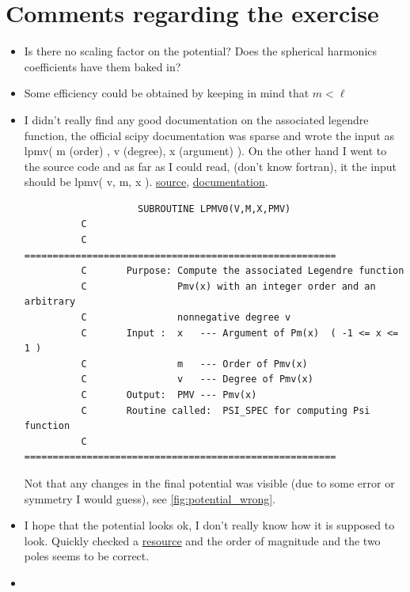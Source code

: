 \documentclass[x11names]{article}
\begin{document}
\section{Comments regarding the exercise}
  \begin{itemize}
    \item Is there no scaling factor on the potential? Does the spherical harmonics coefficients have them baked in?
    \item Some efficiency could be obtained by keeping in mind that \(m<\ell\)
    \item I didn't really find any good documentation on the associated legendre function, the official scipy documentation was sparse and wrote the input as lpmv( m (order) , v (degree), x (argument)  ).
          On the other hand I went to the source code and as far as I could read, (don't know fortran), it the input should be lpmv( v, m, x ). \href{https://github.com/scipy/scipy/blob/master/scipy/special/specfun/specfun.f#L7965}{source}, \href{http://docs.scipy.org/doc/scipy/reference/generated/scipy.special.lpmv.html#scipy.special.lpmv} {documentation}.
          \begin{lstlisting}
                    SUBROUTINE LPMV0(V,M,X,PMV)
          C
          C       =======================================================
          C       Purpose: Compute the associated Legendre function
          C                Pmv(x) with an integer order and an arbitrary
          C                nonnegative degree v
          C       Input :  x   --- Argument of Pm(x)  ( -1 <= x <= 1 )
          C                m   --- Order of Pmv(x)
          C                v   --- Degree of Pmv(x)
          C       Output:  PMV --- Pmv(x)
          C       Routine called:  PSI_SPEC for computing Psi function
          C       =======================================================
          \end{lstlisting}
          Not that any changes in the final potential was visible (due to some error or symmetry I would guess), see \cref{fig:potential_wrong}.
      \item I hope that the potential looks ok, I don't really know how it is supposed to look. Quickly checked a \href{https://engineering.dartmouth.edu/~d76205x/research/papers/global/node5.html}{resource} and the order of magnitude and the two poles seems to be correct.
      \item 
  \end{itemize}
\end{document}
